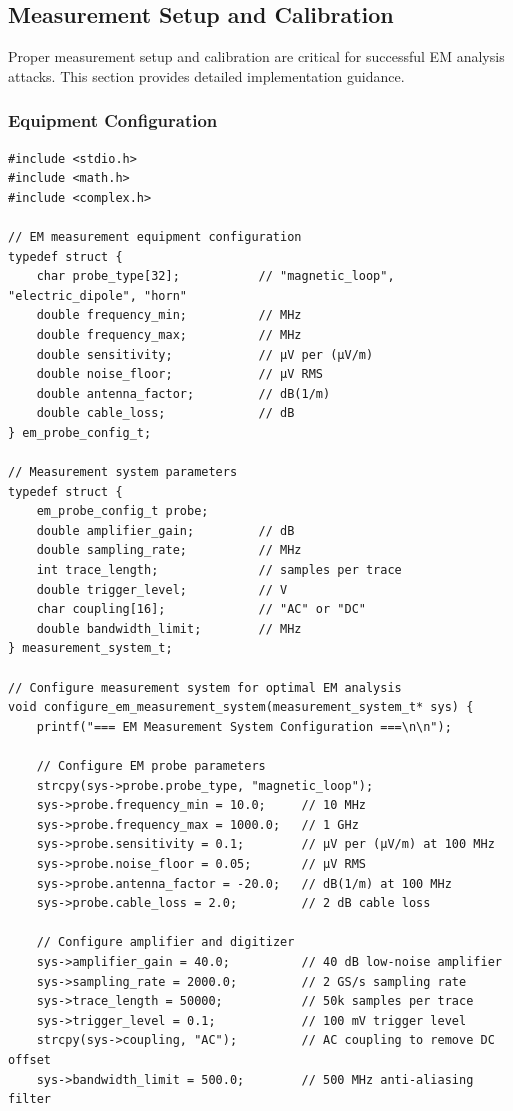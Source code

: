 \documentclass[11pt,a4paper]{article}
\theoremstyle{definition}
\begin{document}
\subsection{Measurement Setup and Calibration}

Proper measurement setup and calibration are critical for successful EM analysis attacks. This section provides detailed implementation guidance.

\subsubsection{Equipment Configuration}

\begin{lstlisting}[caption={EM Measurement System Configuration}]
#include <stdio.h>
#include <math.h>
#include <complex.h>

// EM measurement equipment configuration
typedef struct {
    char probe_type[32];           // "magnetic_loop", "electric_dipole", "horn"
    double frequency_min;          // MHz
    double frequency_max;          // MHz
    double sensitivity;            // μV per (μV/m)
    double noise_floor;            // μV RMS
    double antenna_factor;         // dB(1/m)
    double cable_loss;             // dB
} em_probe_config_t;

// Measurement system parameters
typedef struct {
    em_probe_config_t probe;
    double amplifier_gain;         // dB
    double sampling_rate;          // MHz
    int trace_length;              // samples per trace
    double trigger_level;          // V
    char coupling[16];             // "AC" or "DC"
    double bandwidth_limit;        // MHz
} measurement_system_t;

// Configure measurement system for optimal EM analysis
void configure_em_measurement_system(measurement_system_t* sys) {
    printf("=== EM Measurement System Configuration ===\n\n");
    
    // Configure EM probe parameters
    strcpy(sys->probe.probe_type, "magnetic_loop");
    sys->probe.frequency_min = 10.0;     // 10 MHz
    sys->probe.frequency_max = 1000.0;   // 1 GHz
    sys->probe.sensitivity = 0.1;        // μV per (μV/m) at 100 MHz
    sys->probe.noise_floor = 0.05;       // μV RMS
    sys->probe.antenna_factor = -20.0;   // dB(1/m) at 100 MHz
    sys->probe.cable_loss = 2.0;         // 2 dB cable loss
    
    // Configure amplifier and digitizer
    sys->amplifier_gain = 40.0;          // 40 dB low-noise amplifier
    sys->sampling_rate = 2000.0;         // 2 GS/s sampling rate
    sys->trace_length = 50000;           // 50k samples per trace
    sys->trigger_level = 0.1;            // 100 mV trigger level
    strcpy(sys->coupling, "AC");         // AC coupling to remove DC offset
    sys->bandwidth_limit = 500.0;        // 500 MHz anti-aliasing filter
    

\end{lstlisting}
\end{document}
